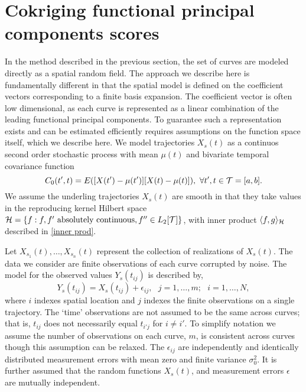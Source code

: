 \section{Cokriging functional principal components scores} %
\label{sec:cokriging_functional_principal_compents_scores}
In the method described in the previous section, the set of curves are modeled directly as a spatial random field. The approach we describe here is fundamentally different in that the spatial model is defined on the coefficient vectors corresponding to a finite basis expansion. The coefficient vector is often low dimensional, as each curve is represented as a linear combination of the leading functional principal components. To guarantee such a representation exists and can be estimated efficiently requires assumptions on the function space itself, which we describe here. 
  We model trajectories $X_s(t)$ as a continuos second order stochastic process with mean $\mu(t)$ and bivariate temporal covariance function
\begin{equation}
	C_{0}(t',t)=E([X(t')-\mu(t')][X(t)-\mu(t)]),\mbox{ }\forall t',t\in \mathcal{T}=[a,b]. 
\end{equation} 
 We assume the underling trajectories $X_s(t)$ are smooth in that they take values in the reproducing kernel Hilbert space $\mathcal{H}= \{f : f, f' \mbox{ absolutely continuous}, f'' \in L_2[\mathcal{T}]\}$, with inner product $\langle f, g \rangle_{\mathcal{H}}$ described in \eqref{inner prod}.

Let $X_{s_1}(t), \dots, X_{s_n}(t)$ represent the collection of realizations of $X_s(t)$. The data we consider are finite observations of each curve corrupted by noise. The model for the observed values $Y_s(t_{ij})$ is described by,
\begin{equation}
	Y_s(t_{ij})=X_s(t_{ij})+\epsilon_{ij},\mbox{ }j=1,\dots,m;\mbox{ }i=1,\dots,N, \label{kriging:observation model}
\end{equation} 
where $i$ indexes spatial location and $j$ indexes the finite observations on a single trajectory. The `time' observations are not assumed to be the same across curves; that is, $t_{ij}$ does not necessarily equal $t_{i'j}$ for $i \neq i'$. To simplify notation we assume the number of observations on each curve, $m$, is consistent across curves though this assumption can be relaxed. The $\epsilon_{ij}$ are independently and identically distributed measurement errors with mean zero and finite variance $\sigma_{0}^{2}.$ It is further assumed that the random functions $X_s(t)$, and measurement errors $\epsilon$ are mutually independent. 


